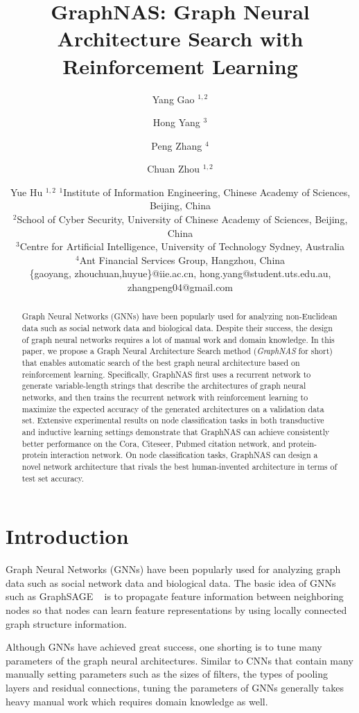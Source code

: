 \documentclass{article}
\title{GraphNAS: Graph Neural Architecture Search with Reinforcement Learning}
\author{
    Yang Gao $^{1,2}$\and
    Hong Yang $^3$\and
    Peng Zhang $^4$\and
    Chuan Zhou $^{1,2}$\and
    Yue Hu $^{1,2}$
    \affiliations
    $^1$Institute of Information Engineering, Chinese Academy of Sciences, Beijing, China \\
    $^2$School of Cyber Security, University of Chinese Academy of Sciences, Beijing, China\\
    $^3$Centre for Artificial Intelligence, University of Technology Sydney, Australia\\
    $^4$Ant Financial Services Group, Hangzhou, China\\
    \emails
    \{gaoyang, zhouchuan,huyue\}@iie.ac.cn,
    hong.yang@student.uts.edu.au,
    zhangpeng04@gmail.com
}
\begin{document}
\maketitle

\begin{abstract}
Graph Neural Networks (GNNs) have been popularly used for analyzing non-Euclidean data such as social network data and biological data. 
Despite their success, the design of graph neural networks requires a lot of manual work and domain knowledge. In this paper, we propose a Graph Neural Architecture Search method (\textit{GraphNAS} for short) that enables automatic search of the best graph neural architecture based on reinforcement learning. Specifically, GraphNAS first uses a recurrent network to generate variable-length strings that describe the architectures of graph neural networks, and then trains the recurrent network with reinforcement learning to maximize the expected accuracy of the generated architectures on a validation data set. Extensive experimental results on node classification tasks in both transductive and inductive learning settings demonstrate that GraphNAS can achieve consistently better performance on the Cora, Citeseer, Pubmed citation network, and protein-protein interaction network. On node classification tasks, GraphNAS can design a novel network architecture that rivals the best human-invented architecture in terms of test set accuracy.
\end{abstract}

\section{Introduction}
Graph Neural Networks (GNNs) have been popularly used for analyzing graph data such as social network data and biological data. 
The basic idea of GNNs such as GraphSAGE ~\cite{GraphSAGE} is to propagate feature information between neighboring nodes so that nodes can learn feature representations by using locally connected graph structure information. 

Although GNNs have achieved great success, one shorting is to tune many parameters of the graph neural architectures. Similar to CNNs that contain many manually setting parameters such as the sizes of filters, the types of pooling layers and residual connections, tuning the parameters of GNNs generally takes heavy manual work which requires domain knowledge as well. 
\end{document}
